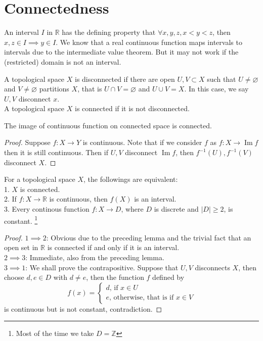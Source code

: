 \section{Connectedness}
An interval $I$ in $\mathbb R$ has the defining property that $\forall x,y,z,x<y<z$, then $x,z\in I\implies y\in I$.
We know that a real continuous function maps intervals to intervals due to the intermediate value theorem.
But it may not work if the (restricted) domain is not an interval.
\begin{definition}
    A topological space $X$ is disconnected if there are open $U,V\subset X$ such that $U\neq\varnothing$ and $V\neq\varnothing$ partitions $X$, that is $U\cap V=\varnothing$ and $U\cup V=X$.
    In this case, we say $U,V$ disconnect $x$.\\
    A topological space $X$ is connected if it is not disconnected.
\end{definition}
\begin{lemma}\label{image_connected}
    The image of continuous function on connected space is connected.
\end{lemma}
\begin{proof}
    Suppose $f:X\to Y$ is continuous.
    Note that if we consider $f$ as $f:X\to\operatorname{Im}f$ then it is still continuous.
    Then if $U,V$ disconnect $\operatorname{Im}f$, then $f^{-1}(U),f^{-1}(V)$ disconnect $X$.
\end{proof}
\begin{theorem}\label{connected_eqv}
    For a topological space $X$, the followings are equivalent:\\
    1. $X$ is connected.\\
    2. If $f:X\to\mathbb R$ is continuous, then $f(X)$ is an interval.\\
    3. Every continous function $f:X\to D$, where $D$ is discrete and $|D|\ge 2$, is constant.
    \footnote{Most of the time we take $D=\mathbb Z$}
\end{theorem}
\begin{proof}
    $1\implies 2$: Obvious due to the preceding lemma and the trivial fact that an open set in $\mathbb R$ is connected if and only if it is an interval.\\
    $2\implies 3$: Immediate, also from the preceding lemma.\\
    $3\implies 1$: We shall prove the contrapositive.
    Suppose that $U,V$ disconnects $X$, then choose $d,e\in D$ with $d\neq e$, then the function $f$ defined by
    $$f(x)=
    \begin{cases}
        d\text{, if $x\in U$}\\
        e\text{, otherwise, that is if $x\in V$}
    \end{cases}$$
    is continuous but is not constant, contradiction.
\end{proof}
